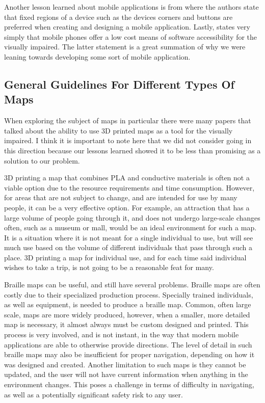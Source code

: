\documentclass{article}
\begin{document}
\newline
\par Another lesson learned about mobile applications is from \cite{RODRIGUEZSANCHEZ20147210} where the authors state that fixed regions of a device such as the devices corners and buttons are preferred when creating and designing a mobile application. Lastly, \cite{bandyopadhyay2017sound} states very simply that mobile phones offer a low cost means of software accessibility for the visually impaired. The latter statement is a great summation of why we were leaning towards developing some sort of mobile application.




\subsection{General Guidelines For Different Types Of Maps}
When exploring the subject of maps in particular there were many papers that talked about the ability to use 3D printed maps as a tool for the visually impaired. I think it is important to note here that we did not consider going in this direction because our lessons learned showed it to be less than promising as a solution to our problem.
\newline
\cite{10.1007/978-3-319-41267-2_20}
\newline
\par 3D printing a map that combines PLA and conductive materials is often not a viable option due to the resource requirements and time consumption. However, for areas that are not subject to change, and are intended for use by many people, it can be a very effective option. For example, an attraction that has a large volume of people going through it, and does not undergo large-scale changes often, such as a museum or mall, would be an ideal environment for such a map. It is a situation where it is not meant for a single individual to use, but will see much use based on the volume of different individuals that pass through such a place. 3D printing a map for individual use, and for each time said individual wishes to take a trip, is not going to be a reasonable feat for many. 
\cite{10.1145/2207676.2207734}
\newline
\par Braille maps can be useful, and still have several problems. Braille maps are often costly due to their specialized production process. Specially trained individuals, as well as equipment, is needed to produce a braille map. Common, often large scale, maps are more widely produced, however, when a smaller, more detailed map is necessary, it almost always must be custom designed and printed. This process is very involved, and is not instant, in the way that modern mobile applications are able to otherwise provide directions. The level of detail in such braille maps may also be insufficient for proper navigation, depending on how it was designed and created. Another limitation to such maps is they cannot be updated, and the user will not have current information when anything in the environment changes. This poses a challenge in terms of difficulty in navigating, as well as a potentially significant safety risk to any user. 
\end{document}
